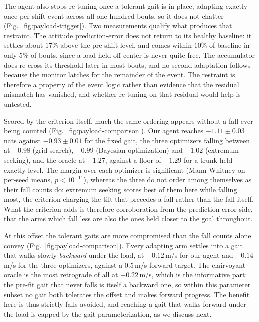\documentclass[letterpaper, 10 pt, conference]{ieeeconf}  %
\begin{document}
The agent also stops re-tuning once a tolerant gait is in place, adapting exactly once per shift event across all one hundred bouts, so it does not chatter (Fig.~\ref{fig:payload-trigger}).
Two measurements qualify what produces that restraint.
The attitude prediction-error does not return to its healthy baseline: it settles about $17\%$ above the pre-shift level, and comes within $10\%$ of baseline in only $5\%$ of bouts, since a load held off-center is never quite free.
The accumulator does re-cross its threshold later in most bouts, and no second adaptation follows because the monitor latches for the remainder of the event.
The restraint is therefore a property of the event logic rather than evidence that the residual mismatch has vanished, and whether re-tuning on that residual would help is untested.

Scored by the criterion itself, much the same ordering appears without a fall ever being counted (Fig.~\ref{fig:payload-comparison}).
Our agent reaches $-1.11 \pm 0.03$\,nats against $-0.93 \pm 0.01$ for the fixed gait, the three optimizers falling between at $-0.98$ (grid search), $-0.99$ (Bayesian optimization) and $-1.02$ (extremum seeking), and the oracle at $-1.27$, against a floor of $-1.29$ for a trunk held exactly level.
The margin over each optimizer is significant (Mann-Whitney on per-seed means, $p < 10^{-11}$), whereas the three do not order among themselves as their fall counts do: extremum seeking scores best of them here while falling most, the criterion charging the tilt that precedes a fall rather than the fall itself.
What the criterion adds is therefore corroboration from the prediction-error side, that the arms which fall less are also the ones held closer to the goal throughout.

At this offset the tolerant gaits are more compromised than the fall counts alone convey (Fig.~\ref{fig:payload-comparison}).
Every adapting arm settles into a gait that walks slowly \emph{backward} under the load, at $-0.12$\,m/s for our agent and $-0.14$\,m/s for the three optimizers, against a $0.5$\,m/s forward target.
The clairvoyant oracle is the most retrograde of all at $-0.22$\,m/s, which is the informative part: the pre-fit gait that never falls is itself a backward one, so within this parameter subset no gait both tolerates the offset and makes forward progress.
The benefit here is thus strictly falls avoided, and reaching a gait that walks forward under the load is capped by the gait parameterization, as we discuss next.

\end{document}
